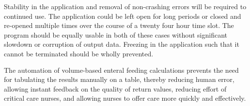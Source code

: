 \documentclass[10pt,draftclsnofoot,onecolumn]{IEEEtran}
\begin{document}
Stability in the application and removal of non-crashing errors will be required to continued use.
The application could be left open for long periods or closed and re-opened multiple times 
over the course of a twenty four hour time slot. The program should be equally usable in both 
of these cases without significant slowdown or corruption of output data. Freezing in the application
such that it cannot be terminated should be wholly prevented.

The automation of volume-based enteral feeding calculations prevents the need for tabulating
the results manually on a table, thereby reducing human error, allowing instant feedback on
the quality of return values, reducing effort of critical care nurses, and allowing nurses to offer
care more quickly and effectively.

\newpage
\printbibliography
\end{document}
